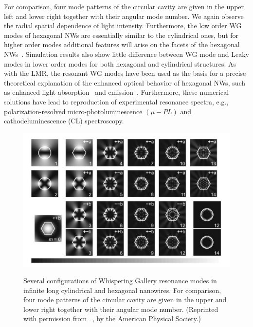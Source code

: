 For comparison, four mode patterns of the circular cavity are given in the
upper left and lower right together with their angular mode number. We again
observe the radial spatial dependence of light intensity. Furthermore, the low
order WG modes of hexagonal NWs are essentially similar to the cylindrical
ones, but for higher order modes additional features will arise on the facets
of the hexagonal NWs~\cite{Nobis:2005wg}. Simulation results also show little
difference between WG mode and Leaky modes in lower order modes for both
hexagonal and cylindrical structures. As with the LMR, the resonant WG modes
have been used as the basis for a precise theoretical explanation of the
enhanced optical behavior of hexagonal NWs, such as enhanced light
absorption~\cite{Cao:2009ho,Kim:2014ig,Zhang:2013wb,Kelzenberg:2010fa,Wang:2013ux}
and emission~\cite{Zimmler:2008fc,Currie:2013to,Le:2014cp,Grzela:2012wa}.
Furthermore, these numerical solutions have lead to reproduction of
experimental resonance spectra, e.g., polarization-resolved
micro-photoluminescence $(\mu-PL)$ and cathodeluminescence (CL) spectroscopy.

\begin{figure}
  \caption[Several configuration of Whispering Gallery resonance modes in infinite long cylindrical and hexagonal nanowires.]{Several configurations of Whispering Gallery resonance modes in infinite long cylindrical and hexagonal nanowires. For comparison, four mode patterns of the circular cavity are given in the upper and lower right together with their angular mode number. (Reprinted with permission from~\cite{Nobis:2005wg} ,  by the American Physical Society.)}
  \centering
  \includegraphics[width=\textwidth]{pictures/LM/WGMode}
  \label{WGMode}
\end{figure}

